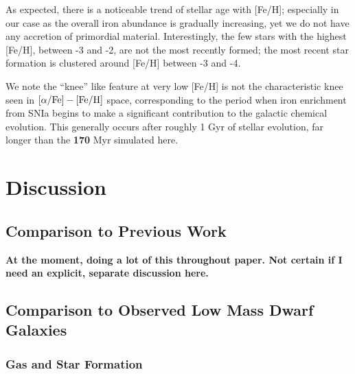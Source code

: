 \documentclass[twocolumn]{aastex61}
\begin{document}
As expected, there is a noticeable trend of stellar age with [Fe/H]; especially in our case as the overall iron abundance is gradually increasing, yet we do not have any accretion of primordial material. Interestingly, the few stars with the highest [Fe/H], between -3 and -2, are not the most recently formed; the most recent star formation is clustered around [Fe/H] between -3 and -4.

We note the ``knee'' like feature at very low [Fe/H] is not the characteristic knee seen in $[\alpha / {\rm Fe}]-[\rm{Fe}/\rm{H}]$ space, corresponding to the period when iron enrichment from SNIa begins to make a significant contribution to the galactic chemical evolution. This generally occurs after roughly 1 Gyr of stellar evolution, far longer than the \textbf{170} Myr simulated here. %

\section{Discussion}
\label{sec:discussion}

\subsection{Comparison to Previous Work}
\textbf{At the moment, doing a lot of this throughout paper. Not certain if I need an explicit, separate discussion here.}

\subsection{Comparison to Observed Low Mass Dwarf Galaxies}
\label{sec:observation}

\subsubsection{Gas and Star Formation}
\label{sec:gas_sf}
\end{document}
